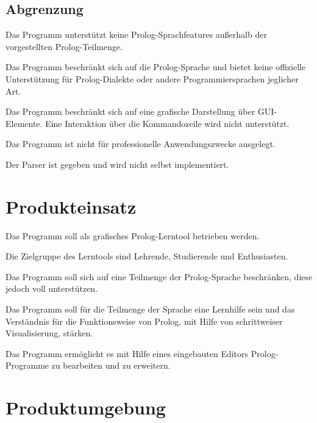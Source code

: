 \documentclass[parskip=full,11pt,twoside]{scrartcl}
\begin{document}
\subsection{Abgrenzung}


Das Programm unterstützt keine Prolog-Sprachfeatures außerhalb der vorgestellten Prolog-Teilmenge.


Das Programm beschränkt sich auf die Prolog-Sprache und bietet keine offizielle Unterstützung für Prolog-Dialekte oder andere Programmiersprachen jeglicher Art.


Das Programm beschränkt sich auf eine grafische Darstellung über GUI-Elemente. Eine Interaktion über die Kommandozeile wird nicht unterstützt.


Das Programm ist nicht für professionelle Anwendungszwecke ausgelegt.


Der Parser ist gegeben und wird nicht selbst implementiert.

\section{Produkteinsatz}

Das Programm soll als grafisches Prolog-Lerntool betrieben werden.

Die Zielgruppe des Lerntools sind Lehrende, Studierende und Enthusiasten.

Das Programm soll sich auf eine Teilmenge der Prolog-Sprache beschränken, diese jedoch voll unterstützen.

Das Programm soll für die Teilmenge der Sprache eine Lernhilfe sein und das Verständnis für die Funktionsweise von Prolog, mit Hilfe von schrittweiser Visualisierung, stärken.

Das Programm ermöglicht es mit Hilfe eines eingebauten Editors Prolog-Programme zu bearbeiten und zu erweitern.

\section{Produktumgebung}
\end{document}
